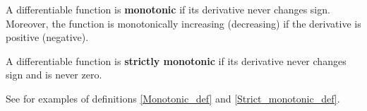 \begin{defin}\label{Monotonic_def}
A differentiable function is \textbf{monotonic} if its derivative never changes sign. Moreover, the function is monotonically increasing (decreasing) if the derivative is positive (negative).
\end{defin}
\begin{defin}\label{Strict_monotonic_def}
A differentiable function is \textbf{strictly monotonic} if its derivative never changes sign and is never zero.
\end{defin}
See  for examples of definitions \ref{Monotonic_def} and \ref{Strict_monotonic_def}.
\begin{figure}[!!!h!!!tb]
\centering
{}

\end{figure}

